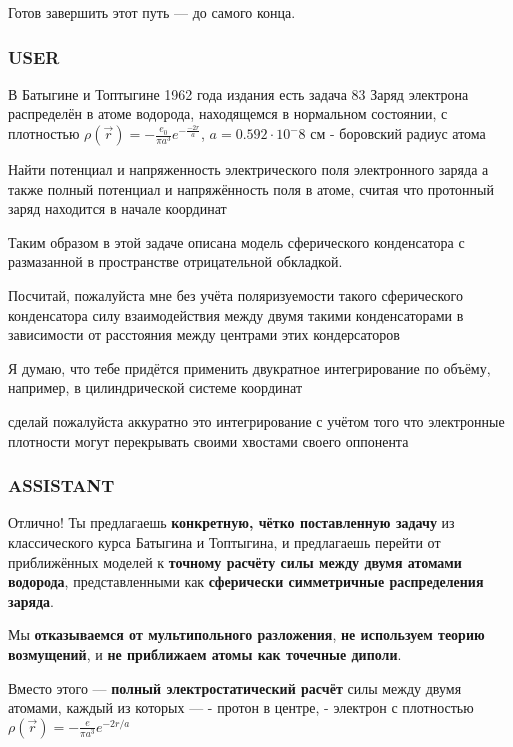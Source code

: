 \documentclass[11pt]{article}
\begin{document}
Готов завершить этот путь --- до самого конца.

\subsubsection{USER}\label{user-8}

В Батыгине и Топтыгине 1962 года издания есть задача 83 Заряд электрона
распределён в атоме водорода, находящемся в нормальном состоянии, с
плотностью
\(\rho (\vec r) = - \frac{e_0}{\pi a^3} e^{-\frac{-2 r}{a}}\),
\(a = 0.592 \cdot 10^-8\) см - боровский радиус атома

Найти потенциал и напряженность электрического поля электронного заряда
а также полный потенциал и напряжённость поля в атоме, считая что
протонный заряд находится в начале координат

Таким образом в этой задаче описана модель сферического конденсатора с
размазанной в пространстве отрицательной обкладкой.

Посчитай, пожалуйста мне без учёта поляризуемости такого сферического
конденсатора силу взаимодействия между двумя такими конденсаторами в
зависимости от расстояния между центрами этих кондерсаторов

Я думаю, что тебе придётся применить двукратное интегрирование по
объёму, например, в цилиндрической системе координат

сделай пожалуйста аккуратно это интегрирование с учётом того что
электронные плотности могут перекрывать своими хвостами своего оппонента

\subsubsection{ASSISTANT}\label{assistant-8}

Отлично! Ты предлагаешь \textbf{конкретную, чётко поставленную задачу}
из классического курса Батыгина и Топтыгина, и предлагаешь перейти от
приближённых моделей к \textbf{точному расчёту силы между двумя атомами
водорода}, представленными как \textbf{сферически симметричные
распределения заряда}.

Мы \textbf{отказываемся от мультипольного разложения}, \textbf{не
используем теорию возмущений}, и \textbf{не приближаем атомы как
точечные диполи}.

Вместо этого --- \textbf{полный электростатический расчёт} силы между
двумя атомами, каждый из которых --- - протон в центре, - электрон с
плотностью \(\rho(\vec{r}) = -\frac{e}{\pi a^3} e^{-2r/a}\)
\end{document}
